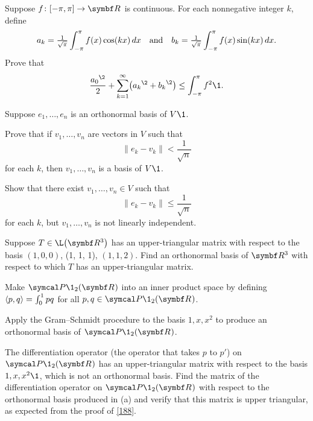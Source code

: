 \begin{exercises}
\exercise
Suppose $\fun f {[-\pi, \pi]} {\R{}}$ is continuous. For each nonnegative integer $k$, define
\[
a_k = \tfrac{1}{\sqrt{\pi}} \int_{-\pi}^{\pi} f(x) \cos(kx) \,dx \andd b_k = \tfrac{1}{\sqrt{\pi}}  \int_{-\pi}^{\pi} f(x) \sin(kx) \,dx.
\]
Prove that
\[
\frac{{a_0}^{\2}}{2} + \sum_{k=1}^\infty \paren[\big]{ {a_k}^{\2} + {b_k}^{\2} } \le \int_{-\pi}^{\pi} f^2\1.
\]


\exercise
Suppose $e_1, \dots, e_n$ is an orthonormal basis of $V\1$.
\begin{subtheorem}
\item
Prove that if $v_1, \dots, v_n$ are vectors in $V$ such that
\[
\|e_k - v_k\| < \frac{1}{\sqrt{n}}
\]
for each $k$, then $v_1, \dots, v_n$ is a basis of $V\1$.

\item
Show that there exist $v_1, \ldots, v_n \in V$ such that
\[
\|e_k - v_k\| \le \frac{1}{\sqrt{n}}
\]
for each $k$, but $v_1, \ldots, v_n$ is not linearly independent.
\end{subtheorem}


\exercise
Suppose $T \in \L\paren[\big]{\R{3}}$ has an upper-triangular matrix with respect to the basis $(1, 0, 0)$, (1, 1, 1), $(1, 1, 2)$. Find an orthonormal basis of $\R{3}$ with respect to which $T$ has an upper-triangular matrix.


\exercise
Make $\P\1_2(\R{})$ into an inner product space by defining \label{375}
$
\langle p, q\rangle = \int_0^1 pq
$
for all $p, q \in \P\1_2(\R{})$.
\begin{subtheorem}
\item
Apply the Gram--Schmidt procedure to the basis $1, x, x^2$ to produce an
orthonormal basis of $\P\1_2(\R{})$.
\item
The differentiation operator \big(the operator that
takes $p$ to $p'$\big) on $\P\1_2(\R{})$ has an upper-triangular matrix with respect to
the basis $1, x, x^2\1$, which is not an orthonormal basis. Find the matrix of the differentiation operator on $\P\1_2(\R{})$ with respect to the orthonormal basis produced in (a) and verify that this matrix is upper triangular, as expected from the proof of \ref{188}.
\end{subtheorem}
\exercisesubtheoremend



\end{exercises}
